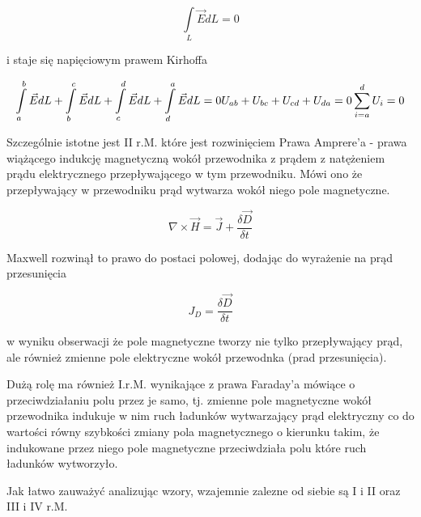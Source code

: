 \begin{solution}
$$\int\limits_L \vec{E} dL = 0 $$

i staje się napięciowym prawem Kirhoffa

$$ \int\limits_{a}^{b} \vec{E} dL + \int\limits_{b}^{c}\vec{E} dL + \int\limits_{c}^{d} \vec{E} dL + \int\limits_{d}^{a} \vec{E} dL = 0\\  U_{ab} + U_{bc} + U_{cd} + U_{da} = 0\\ \sum_{i=a}^{d} U_{i}=0  $$

Szczególnie istotne jest II r.M. które jest rozwinięciem Prawa Amprere'a - prawa wiążącego indukcję magnetyczną wokół przewodnika z prądem z natężeniem prądu elektrycznego przepływającego w tym przewodniku. Mówi ono że przepływający w przewodniku prąd wytwarza wokół niego pole magnetyczne. 

$$\nabla \times \vec{H} =  \vec{J} + \frac{ \delta  \vec{D} }{\delta t} $$

Maxwell rozwinął to prawo do postaci polowej, dodając do wyrażenie na prąd przesunięcia

$$J_{D} = \frac{\delta \vec{D}}{\delta t} $$

w wyniku obserwacji że pole magnetyczne tworzy nie tylko przepływający prąd, ale również zmienne pole elektryczne wokół przewodnka (prad przesunięcia).

Dużą rolę ma również I.r.M. wynikające z prawa Faraday'a mówiące o przeciwdziałaniu polu przez je samo, tj. zmienne pole magnetyczne wokół przewodnika indukuje w nim ruch ładunków wytwarzający prąd elektryczny co do wartości równy szybkości zmiany pola magnetycznego o kierunku takim, że indukowane przez niego pole magnetyczne przeciwdziała polu które ruch ładunków wytworzyło.

Jak łatwo zauważyć analizując wzory, wzajemnie zalezne od siebie są I i II oraz III i IV r.M. 
\\

\end{solution}